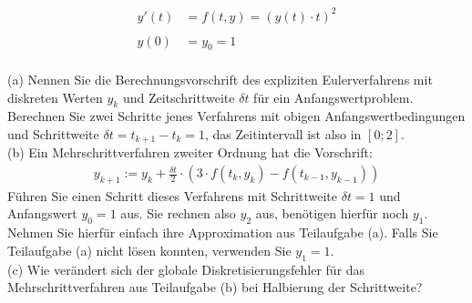 \documentclass{scrartcl}
\begin{document}
	\begin{align*}
	y'(t) &= f(t,y) = (y(t) \cdot t)^2 \\ \\
	y(0) &= y_0 = 1
	\end{align*}
	\\
	(a)
	Nennen Sie die Berechnungsvorschrift des expliziten Eulerverfahrens mit diskreten Werten $y_k$ und Zeitschrittweite $\delta t$ für ein Anfangswertproblem.
	\n 
	Berechnen Sie zwei Schritte jenes Verfahrens mit obigen Anfangswertbedingungen und Schrittweite $\delta t = t_{k+1} - t_k = 1$, das Zeitintervall ist also in $[0;2]$.
	\\
	(b)
	Ein Mehrschrittverfahren zweiter Ordnung hat die Vorschrift:
	\begin{align*}
	y_{k+1} := y_k + \frac{\delta t}{2} \cdot \left( 3\cdot f(t_k, y_k) - f(t_{k-1}, y_{k-1}) \right)
	\end{align*}
	Führen Sie einen Schritt dieses Verfahrens mit Schrittweite $\delta t = 1$ und Anfangswert $y_0 = 1$ aus. Sie rechnen also $y_2$ aus, benötigen hierfür noch $y_1$. Nehmen Sie hierfür einfach ihre Approximation aus Teilaufgabe (a). Falls Sie Teilaufgabe (a) nicht lösen konnten, verwenden Sie $y_1=1$.
	\\
	(c)
	Wie verändert sich der globale Diskretisierungsfehler für das Mehrschrittverfahren aus Teilaufgabe (b) bei Halbierung der Schrittweite?
	
\end{document}
